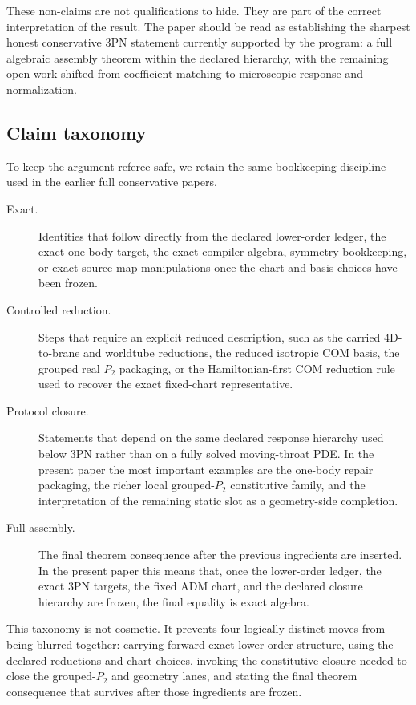 \documentclass[11pt]{article}
\begin{document}
These non-claims are not qualifications to hide.  They are part of the correct
interpretation of the result.  The paper should be read as establishing the
sharpest honest conservative $3$PN statement currently supported by the program:
a full algebraic assembly theorem within the declared hierarchy, with the
remaining open work shifted from coefficient matching to microscopic response
and normalization.

\subsection{Claim taxonomy}
\label{sec:intro-taxonomy}

To keep the argument referee-safe, we retain the same bookkeeping discipline used
in the earlier full conservative papers.
\begin{description}
  \item[Exact.] Identities that follow directly from the declared lower-order
  ledger, the exact one-body target, the exact compiler algebra, symmetry
  bookkeeping, or exact source-map manipulations once the chart and basis
  choices have been frozen.

  \item[Controlled reduction.] Steps that require an explicit reduced
  description, such as the carried $4$D-to-brane and worldtube reductions, the
  reduced isotropic COM basis, the grouped real $P_2$ packaging, or the
  Hamiltonian-first COM reduction rule used to recover the exact fixed-chart
  representative.

  \item[Protocol closure.] Statements that depend on the same declared response
  hierarchy used below $3$PN rather than on a fully solved moving-throat PDE.
  In the present paper the most important examples are the one-body repair
  packaging, the richer local grouped-$P_2$ constitutive family, and the
  interpretation of the remaining static slot as a geometry-side completion.

  \item[Full assembly.] The final theorem consequence after the previous
  ingredients are inserted.  In the present paper this means that, once the
  lower-order ledger, the exact $3$PN targets, the fixed ADM chart, and the
  declared closure hierarchy are frozen, the final equality is exact algebra.
\end{description}

This taxonomy is not cosmetic.  It prevents four logically distinct moves from
being blurred together: carrying forward exact lower-order structure, using the
declared reductions and chart choices, invoking the constitutive closure needed
to close the grouped-$P_2$ and geometry lanes, and stating the final theorem
consequence that survives after those ingredients are frozen.
\end{document}
